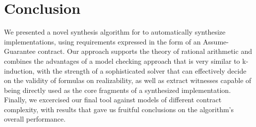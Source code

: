 \section{Conclusion}
\label{sec:conclusion}
We presented a novel synthesis algorithm for
to automatically synthesize implementations, using requirements expressed in the
form of an Assume-Guarantee contract. Our approach supports the theory of
rational arithmetic and combines the advantages of a model checking approach
that is very similar to k-induction, with the strength of a sophisticated solver
that can effectively decide on the validity of formulas on realizability, as
well as extract witnesses capable of being directly used as the core fragments
of a synthesized implementation. Finally, we excercised our final tool against
models of different contract complexity, with results that gave us fruitful
conclusions on the algorithm's overall performance.
